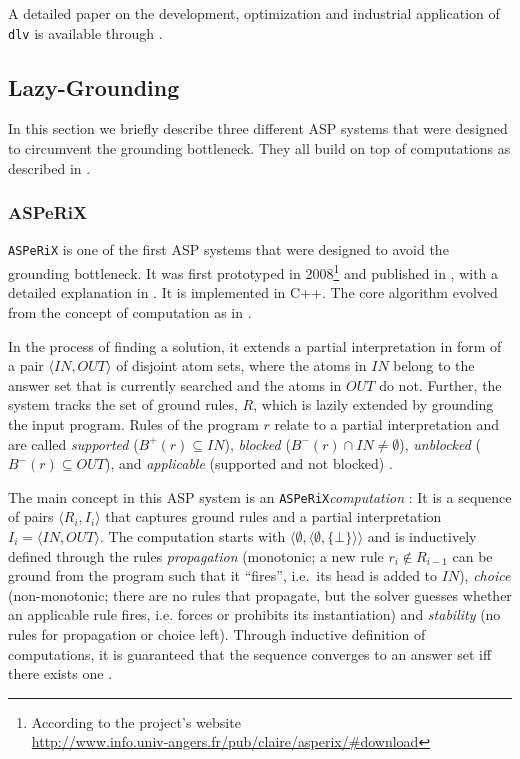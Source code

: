 \documentclass{vutinfth} %
\newcommand{\bodyf}{B}
\newcommand{\asperix}{\texttt{ASPeRiX}\xspace}
\newcommand{\dlv}{\texttt{dlv}\xspace}
\begin{document}
A detailed paper on the development, optimization and industrial application of \dlv is available through \cite{dlvproject}.

\subsection{Lazy-Grounding}

In this section we briefly describe three different ASP systems that were designed to circumvent the grounding bottleneck. They all build on top of computations as described in \cite{computations}.

\subsubsection{ASPeRiX}
\label{sec:asperix}

\asperix is one of the first ASP systems that were designed to avoid the grounding bottleneck. It was first prototyped in 2008\footnote{According to the project's website\\ \url{http://www.info.univ-angers.fr/pub/claire/asperix/\#download}} and published in \cite{asperixfirst,fofchain}, with a detailed explanation in \cite{asperix}. It is implemented in C++. The core algorithm evolved from the concept of computation as in \cite{computations}.

In the process of finding a solution, it extends a partial interpretation \cite[Def.~4]{asperix} in form of a pair $\langle IN, OUT \rangle$ of disjoint atom sets, where the atoms in $IN$ belong to the answer set that is currently searched and the atoms in $OUT$ do not. Further, the system tracks the set of ground rules, $R$, which is lazily extended by grounding the input program. Rules of the program $r$ relate to a partial interpretation and are called \emph{supported} ($\bodyf^+(r) \subseteq IN$), \emph{blocked} ($\bodyf^-(r) \cap IN \not = \emptyset$), \emph{unblocked} ($\bodyf^-(r) \subseteq OUT$), and \emph{applicable} (supported and not blocked) \cite[Def.~5]{asperix}. 

The main concept in this ASP system is an \asperix \emph{computation} \cite[Def.~7]{asperix}: It is a sequence of pairs $\langle R_i, I_i \rangle$ that captures ground rules and a partial interpretation $I_i = \langle IN, OUT \rangle$. The computation starts with $\langle \emptyset, \langle \emptyset, \{ \bot \} \rangle \rangle$ and is inductively defined through the rules \emph{propagation} (monotonic; a new rule $r_i \not \in R_{i-1}$ can be ground from the program such that it \enquote{fires}, i.e.~its head is added to $IN$), \emph{choice} (non-monotonic; there are no rules that propagate, but the solver guesses whether an applicable rule fires, i.e. forces or prohibits its instantiation) and \emph{stability} (no rules for propagation or choice left). Through inductive definition of computations, it is guaranteed that the sequence converges to an answer set iff there exists one \cite[Thm.~2]{asperix}.
\end{document}
